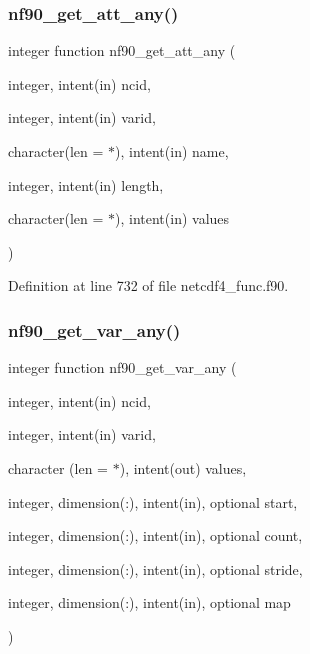\subsubsection{\texorpdfstring{nf90\+\_\+get\+\_\+att\+\_\+any()}{nf90\_get\_att\_any()}}
{\footnotesize\ttfamily integer function nf90\+\_\+get\+\_\+att\+\_\+any (\begin{DoxyParamCaption}\item[{integer, intent(in)}]{ncid,  }\item[{integer, intent(in)}]{varid,  }\item[{character(len = $\ast$), intent(in)}]{name,  }\item[{integer, intent(in)}]{length,  }\item[{character(len = $\ast$), intent(in)}]{values }\end{DoxyParamCaption})}



Definition at line 732 of file netcdf4\+\_\+func.\+f90.

\mbox{\label{netcdf4__func_8f90_af167ecc2a0d49c398f8f4a8c0a49d70c}} 
\subsubsection{\texorpdfstring{nf90\+\_\+get\+\_\+var\+\_\+any()}{nf90\_get\_var\_any()}}
{\footnotesize\ttfamily integer function nf90\+\_\+get\+\_\+var\+\_\+any (\begin{DoxyParamCaption}\item[{integer, intent(in)}]{ncid,  }\item[{integer, intent(in)}]{varid,  }\item[{character (len = $\ast$), intent(out)}]{values,  }\item[{integer, dimension(\+:), intent(in), optional}]{start,  }\item[{integer, dimension(\+:), intent(in), optional}]{count,  }\item[{integer, dimension(\+:), intent(in), optional}]{stride,  }\item[{integer, dimension(\+:), intent(in), optional}]{map }\end{DoxyParamCaption})}



